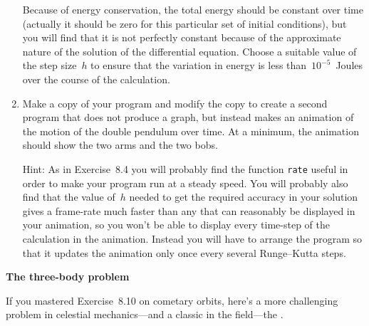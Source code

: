 \documentclass[12pt]{article}
\begin{document}
\begin{exercises}
\begin{enumerate}
  Because of energy conservation, the total energy should be constant over
  time (actually it should be zero for this particular set of initial
  conditions), but you will find that it is not perfectly constant because
  of the approximate nature of the solution of the differential equation.
  Choose a suitable value of the step size~$h$ to ensure that the variation
  in energy is less than~$10^{-5}$~Joules over the course of the
  calculation.

\item Make a copy of your program and modify the copy to create a second
  program that does not produce a graph, but instead makes an animation of
  the motion of the double pendulum over time.  At a minimum, the animation
  should show the two arms and the two bobs.

  Hint: As in Exercise~8.4 you will probably find the function \verb|rate|
  useful in order to make your program run at a steady speed.  You will
  probably also find that the value of~$h$ needed to get the required
  accuracy in your solution gives a frame-rate much faster than any that
  can reasonably be displayed in your animation, so you won't be able to
  display every time-step of the calculation in the animation.  Instead you
  will have to arrange the program so that it updates the animation only
  once every several Runge--Kutta steps.
\end{enumerate}



\exercise \textbf{The three-body problem}

\exskip If you mastered Exercise~8.10 on cometary orbits, here's a more
challenging problem in celestial mechanics---and a classic in the
field---the .


\end{exercises}
\end{document}
